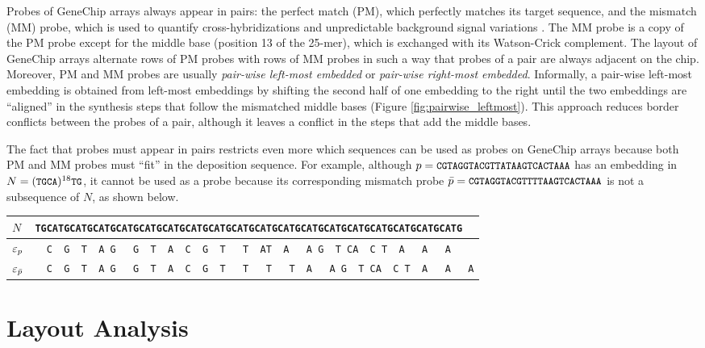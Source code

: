Probes of GeneChip arrays always appear in pairs: the perfect match (PM), which
perfectly matches its target sequence, and the mismatch (MM) probe, which is
used to quantify cross-hybridizations and unpredictable background signal
variations \citep{Affymetrix2001}. The MM probe is a copy of the PM probe except
for the middle base (position 13 of the 25-mer), which is exchanged with its
Watson-Crick complement. The layout of GeneChip arrays alternate rows of PM
probes with rows of MM probes in such a way that probes of a pair are always
adjacent on the chip. Moreover, PM and MM probes are usually \emph{pair-wise
left-most embedded} or \emph{pair-wise right-most embedded}. Informally, a
pair-wise left-most embedding is obtained from left-most embeddings by shifting
the second half of one embedding to the right until the two embeddings are
``aligned'' in the synthesis steps that follow the mismatched middle bases
(Figure \ref{fig:pairwise_leftmost}). This approach reduces border conflicts
between the probes of a pair, although it leaves a conflict in the steps that
add the middle bases.

The fact that probes must appear in pairs restricts even more which sequences
can be used as probes on GeneChip arrays because both PM and MM probes must
``fit'' in the deposition sequence. For example, although
$p={\text{\small{\tt{CGTAGGTACGTTATAAGTCACTAAA}}}}$ has an embedding in
$N=({\text{\small{\tt{TGCA}}}})^{18}{\text{\small{\tt{TG}}}}$, it cannot be used as a probe because its
corresponding mismatch probe $\bar{p}={\text{\small{\tt{CGTAGGTACGTTTTAAGTCACTAAA}}}}$ is not
a subsequence of $N$, as shown below.

\begin{tabular}{lc}
$N$              & \footnotesize{\tt{\verb|TGCATGCATGCATGCATGCATGCATGCATGCATGCATGCATGCATGCATGCATGCATGCATGCATGCATGCATG  |}} \\
\hline
$\varepsilon_p$         & \footnotesize{\tt{\verb|  C  G  T  A G   G  T  A  C  G  T   T  AT  A   A G  T CA  C T  A   A   A    |}} \\
$\varepsilon_{\bar{p}}$ & \footnotesize{\tt{\verb|  C  G  T  A G   G  T  A  C  G  T   T   T   T  A   A G  T CA  C T  A   A   A|}} \\
\hline
\end{tabular}

\section{Layout Analysis}
\label{sec:affy_analysis}

